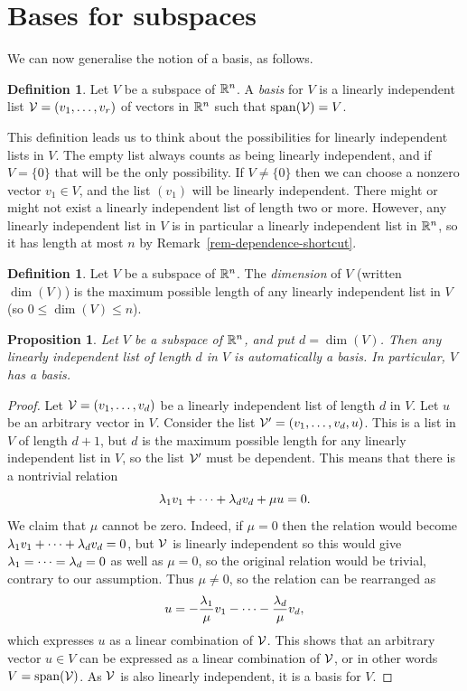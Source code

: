 \documentclass[reqno]{amsart}
\newtheorem{proposition}[theorem]{Proposition}
\theoremstyle{definition}
\newtheorem{definition}[theorem]{Definition}
\newcommand{\dfn}[1]{\emph{{#1}}\index{#1}}
\begin{document}
\section{Bases for subspaces}

We can now generalise the notion of a basis, as follows.

\begin{definition}\label{defn-subspace-basis}
 Let $V$ be a subspace of ${\mathbb{R}}^n$.  A \emph{basis} for $V$ is a
 linearly independent list $\mathcal{V}=(v_1,\dotsc,v_r)$ of vectors in ${\mathbb{R}}^n$
 such that $\operatorname{span}(\mathcal{V})=V$.
\end{definition}

This definition leads us to think about the possibilities for linearly
independent lists in $V$.  The empty list always counts as being
linearly independent, and if $V=\{0\}$ that will be the only
possibility.  If $V\neq\{0\}$ then we can choose a nonzero vector
$v_1\in V$, and the list $(v_1)$ will be linearly independent.  There
might or might not exist a linearly independent list of length two or
more.  However, any linearly independent list in $V$ is in particular
a linearly independent list in ${\mathbb{R}}^n$, so it has length at most $n$ by
Remark~\ref{rem-dependence-shortcut}.

\begin{definition}\label{defn-dim}
 Let $V$ be a subspace of ${\mathbb{R}}^n$.  The \dfn{dimension} of $V$
 (written $\dim(V)$) is the maximum possible length of any linearly
 independent list in $V$ (so $0\leq\dim(V)\leq n$).
\end{definition}

\begin{proposition}\label{prop-subspace-basis}
 Let $V$ be a subspace of ${\mathbb{R}}^n$, and put $d=\dim(V)$.  Then any
 linearly independent list of length $d$ in $V$ is automatically a
 basis.  In particular, $V$ has a basis.
\end{proposition}
\begin{proof}
 Let $\mathcal{V}=(v_1,\dotsc,v_d)$ be a linearly independent list of length
 $d$ in $V$.  Let $u$ be an arbitrary vector in $V$.  Consider the
 list $\mathcal{V}'=(v_1,\dotsc,v_d,u)$.  This is a list in $V$ of length
 $d+1$, but $d$ is the maximum possible length for any linearly
 independent list in $V$, so the list $\mathcal{V}'$ must be dependent.  This
 means that there is a nontrivial relation
 \[ \lambda_1v_1+\dotsb+\lambda_dv_d+\mu u=0. \]
 We claim that $\mu$ cannot be zero.  Indeed, if $\mu=0$ then the
 relation would become $\lambda_1v_1+\dotsb+\lambda_dv_d=0$, but $\mathcal{V}$ is
 linearly independent so this would give $\lambda_1=\dotsb=\lambda_d=0$ as
 well as $\mu=0$, so the original relation would be trivial, contrary
 to our assumption.  Thus $\mu\neq 0$, so the relation can be
 rearranged as
 \[ u = -\frac{\lambda_1}{\mu}v_1 - \dotsb - \frac{\lambda_d}{\mu}v_d,  \]
 which expresses $u$ as a linear combination of $\mathcal{V}$.  This shows
 that an arbitrary vector $u\in V$ can be expressed as a linear
 combination of $\mathcal{V}$, or in other words $V=\operatorname{span}(\mathcal{V})$.  As $\mathcal{V}$ is
 also linearly independent, it is a basis for $V$.
\end{proof}
\end{document}
